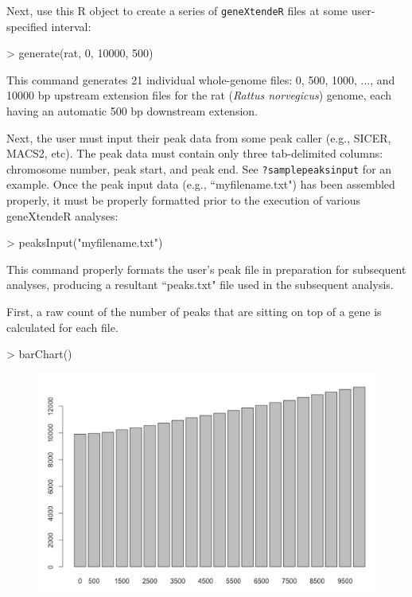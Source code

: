 \documentclass[12pt]{article}
\begin{document}
Next, use this R object to create a series of \texttt{geneXtendeR} files at some user-specified interval:

\begin{Schunk}
\begin{Sinput}
> generate(rat, 0, 10000, 500)
\end{Sinput}
\end{Schunk}


This command generates 21 individual whole-genome files: 0, 500, 1000, ..., and 10000 bp upstream extension files for the rat (\emph{Rattus norvegicus}) genome, each having an automatic 500 bp downstream extension.

Next, the user must input their peak data from some peak caller (e.g., SICER, MACS2, etc).  The peak data must contain only three tab-delimited columns: chromosome number, peak start, and peak end.  See \texttt{?samplepeaksinput} for an example.  Once the peak input data (e.g., ``myfilename.txt") has been assembled properly, it must be properly formatted prior to the execution of various geneXtendeR analyses:

\begin{Schunk}
\begin{Sinput}
> peaksInput("myfilename.txt")
\end{Sinput}
\end{Schunk}

This command properly formats the user's peak file in preparation for subsequent analyses, producing a resultant ``peaks.txt" file used in the subsequent analysis.

First, a raw count of the number of peaks that are sitting on top of a gene is calculated for each file.

\begin{Schunk}
\begin{Sinput}
> barChart()
\end{Sinput}
\end{Schunk}

\begin{figure}[H]
\centering
\includegraphics{figures/fig1.png}
\end{figure}
\end{document}
